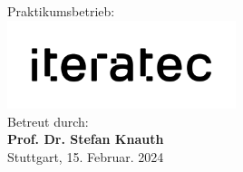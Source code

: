 \begin{titlepage}
\begin{center}
        \normalsize
        \vspace{0.8cm}
        Praktikumsbetrieb:\\ 
        \large
        \includegraphics[width=0.5\textwidth]{figures/iteratec-Logo.png}\\
        \vspace{0.3cm}
        \normalsize
        Betreut durch:\> \\ 
        \large
        \textbf{Prof. Dr. Stefan Knauth} \\
        \normalsize
        \vspace{0.5cm}
        Stuttgart, 15. Februar. 2024\\
    \end{center}
\end{titlepage}